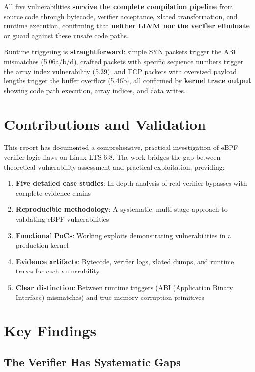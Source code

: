 \noindent
All five vulnerabilities \textbf{survive the complete compilation pipeline} from source code through bytecode, verifier acceptance, xlated transformation, and runtime execution, confirming that \textbf{neither LLVM nor the verifier eliminate} or guard against these unsafe code paths. 

\noindent
Runtime triggering is \textbf{straightforward}: simple SYN packets trigger the ABI mismatches (5.06a/b/d), crafted packets with specific sequence numbers trigger the array index vulnerability (5.39), and TCP packets with oversized payload lengths trigger the buffer overflow (5.46b), all confirmed by \textbf{kernel trace output} showing code path execution, array indices, and data writes.

\section{Contributions and Validation}

This report has documented a comprehensive, practical investigation of eBPF verifier logic flaws on Linux LTS 6.8. The work bridges the gap between theoretical vulnerability assessment and practical exploitation, providing:

\begin{enumerate}[label=\arabic*.]
  \item \textbf{Five detailed case studies}: In-depth analysis of real verifier bypasses with complete evidence chains
  \item \textbf{Reproducible methodology}: A systematic, multi-stage approach to validating eBPF vulnerabilities
  \item \textbf{Functional PoCs}: Working exploits demonstrating vulnerabilities in a production kernel
  \item \textbf{Evidence artifacts}: Bytecode, verifier logs, xlated dumps, and runtime traces for each vulnerability
  \item \textbf{Clear distinction}: Between runtime triggers (ABI (Application Binary Interface) mismatches) and true memory corruption primitives
\end{enumerate}

\section{Key Findings}

\subsection{The Verifier Has Systematic Gaps}

